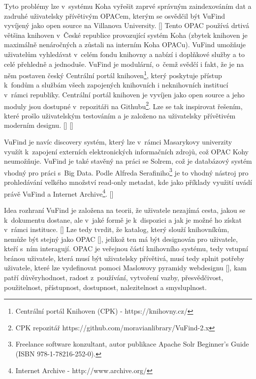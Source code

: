 \documentclass[
	11pt, oneside, printed, final, palatino, monochrome
	microtype,
	table,   %
	lof,     %
	lot     %
]{fithesis3}
\newcommand{\citepages}[2]{[\cite[#1]{#2}]}
\newcommand{\citesource}[1]{[\cite{#1}]}
\begin{document}
{Tyto problémy lze v~systému Koha vyřešit zaprvé správným zaindexováním dat a zadruhé uživatelsky přívětivým OPACem, kterým se osvědčil být VuFind vyvíjený jako open source na Villanova University. \citepages{12}{Coufalova2009} Tento OPAC používá drtivá většina knihoven v~České republice provozující systém Koha (zbytek knihoven je maximálně nenáročných a zůstali na interním Koha OPACu). VuFind umožňuje uživatelům vyhledávat v~celém fondu knihovny a nabízí i doplňkové služby a to celé přehledně a jednoduše. VuFind je modulární, o~čemž svědčí i fakt, že je na něm postaven český Centrální portál knihoven\footnote{Centrální portál Knihoven (CPK) - https://knihovny.cz/}, který poskytuje přístup k~fondům a službám všech zapojených knihovních i neknihovních institucí v~rámci republiky. Centrální portál knihoven je vyvíjen jako open source a jeho moduly jsou dostupné v~repozitáři na Githubu\footnote{CPK repozitář https://github.com/moravianlibrary/VuFind-2.x
}. Lze se tak inspirovat řešením, které prošlo uživatelským testováním a je založeno na uživatelsky přívětivém moderním designu. \citesource{aktivity_2016}  \citesource{smlouva_o_dilo_2015}

VuFind je navíc discovery systém, který lze v~rámci Masarykovy univerzity využít k~zapojení externích elektronických informačních zdrojů, což OPAC Kohy neumožňuje. VuFind je také stavěný na práci se Solrem, což je databázový systém vhodný pro práci s~Big Data. Podle Alfreda Serafiniho\footnote{Freelance software konzultant, autor publikace Apache Solr Beginner's Guide (ISBN 978-1-78216-252-0).} je to vhodný nástroj pro prohledávání velkého množství read-only metadat, kde jako příklady využití uvádí právě VuFind a Internet Archive\footnote{Internet Archive - http://www.archive.org/}. \citepages{20}{68071520130101}

Idea rozhraní VuFind je založena na teorii, že uživatele nezajímá cesta, jakou se k~dokumentu dostane, ale v~jaké formě je k~dispozici a jak je možné ho získat v~rámci instituce. \citepages{20}{Coufalova2009} Lze tedy tvrdit, že katalog, který slouží knihovníkům, nemůže být stejný jako OPAC \citepages{5}{Schmidt2012}, jelikož ten má být designován pro uživatele, kteří s~ním interagují. OPAC je veřejnou částí knihovního systému, tedy vstupní bránou uživatele, která musí být uživatelsky přívětivá, musí tedy splnit potřeby uživatele, které lze vydefinovat pomoci Maslowovy pyramidy webdesignu \citepages{156-179}{rezac_2014}, kam patří důvěryhodnost, radost z~používání, vytvoření vazby, přesvědčivost, použitelnost, přístupnost, dostupnost, nalezitelnost a smysluplnost. 

}
\end{document}
